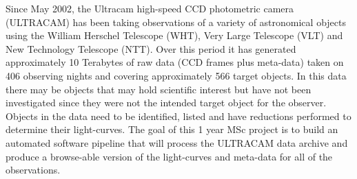 Since May 2002, the  Ultracam high-speed CCD photometric camera 
(ULTRACAM) has been taking observations of a variety of astronomical 
objects using the William Herschel Telescope (WHT), Very Large 
Telescope (VLT) and New Technology Telescope (NTT). Over this period 
it has generated approximately 10 Terabytes of raw data (CCD frames 
plus meta-data) taken on 406 observing nights and covering 
approximately 566 target objects. In this data there may be objects 
that may hold scientific interest but have not been investigated since they were not the intended target object for the observer. 
Objects in the data need to be identified, listed and have 
reductions performed to determine their light-curves. The goal of 
this 1 year MSc project is to build an automated software pipeline 
that will process the ULTRACAM data archive and produce a 
browse-able version of the light-curves and meta-data for all of the 
observations. 
